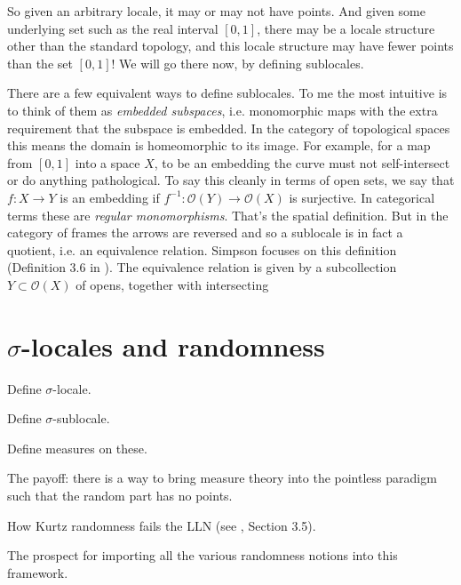 \documentclass[12pt]{article}
\renewcommand{\o}{\ensuremath{\mathcal{O}}}
\begin{document}
So given an arbitrary locale, it may or may not have points. And given some underlying set such as the real interval $[0,1]$, there may be a locale structure other than the standard topology, and this locale structure may have fewer points than the set $[0,1]$! We will go there now, by defining sublocales.

There are a few equivalent ways to define sublocales. To me the most intuitive is to think of them as \emph{embedded subspaces}, i.e. monomorphic maps with the extra requirement that the subspace is embedded. In the category of topological spaces this means the domain is homeomorphic to its image. For example, for a map from $[0,1]$ into a space $X$, to be an embedding the curve must not self-intersect or do anything pathological. To say this cleanly in terms of open sets, we say that $f:X\to Y$ is an embedding if $f^{-1}:\o(Y)\to \o(X)$ is surjective. In categorical terms these are \emph{regular monomorphisms}. That's the spatial definition. But in the category of frames the arrows are reversed and so a sublocale is in fact a quotient, i.e. an equivalence relation. Simpson focuses on this definition (Definition 3.6 in \cite{simpson}). The equivalence relation is given by a subcollection $Y\subset\o(X)$ of opens, together with intersecting 


\section{$\sigma$-locales and randomness}
Define $\sigma$-locale.

Define $\sigma$-sublocale.

Define measures on these.

The payoff: there is a way to bring measure theory into the pointless paradigm such that the random part has no points.

How Kurtz randomness fails the LLN (see \cite{NiesAndre2009CaR}, Section 3.5). 

The prospect for importing all the various randomness notions into this framework.
\end{document}
